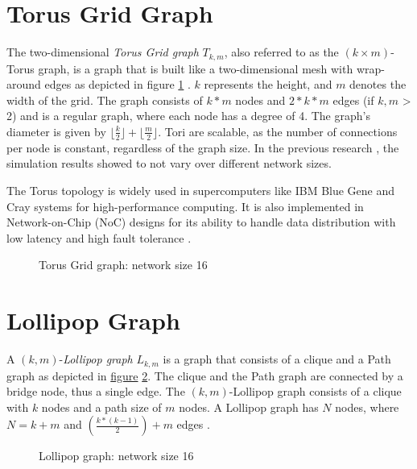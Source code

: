 \section{Torus Grid Graph}\label{sec:2torusgridgraph}
The two-dimensional \textit{Torus Grid graph} $T_{k,m}$, also referred to as the $(k \times m)$-Torus graph, is a graph that is built like a two-dimensional mesh with wrap-around edges as depicted in figure \ref{fig:torusGraph} \cite{Mahlmann2010}. $k$ represents the height, and $m$ denotes the width of the grid. The graph consists of $k * m$ nodes and $2* k * m$ edges (if $k, m$ > 2) and is a regular graph, where each node has a degree of 4. The graph's diameter is given by $\lfloor\frac{k}{2}\rfloor + \lfloor\frac{m}{2}\rfloor$. Tori are scalable, as the number of connections per node is constant, regardless of the graph size. In the previous research \cite{Bayazitoglu}, the simulation results showed to not vary over different network sizes.

The Torus topology is widely used in supercomputers like IBM Blue Gene and Cray systems for high-performance computing. It is also implemented in Network-on-Chip (NoC) designs for its ability to handle data distribution with low latency and high fault tolerance \cite{Banerjee2001}.

\begin{figure}[H]
    \centering
    \scalebox{1.5}{}
    \caption{Torus Grid graph: network size 16}
    \label{fig:torusGraph}
\end{figure}

\section{Lollipop Graph}\label{sec:2lollipopgraph}
A $(k, m)$-\textit{Lollipop graph} $L_{k,m}$ is a graph that consists of a clique and a Path graph as depicted in \hyperref[fig:lollipopgraphDemo]{figure} \ref{fig:lollipopgraphDemo}. The clique and the Path graph are connected by a bridge node, thus a single edge. The $(k, m)$-Lollipop graph consists of a clique with $k$ nodes and a path size of $m$ nodes. A Lollipop graph has $N$ nodes, where $N = k+m$ and $(\frac{k*(k-1)}{2})+m$ edges \cite{JonassonLollipopGraphs2000}.

\begin{figure}[H]
    \centering
    \scalebox{1}{}
    \caption{Lollipop graph: network size 16}
    \label{fig:lollipopgraphDemo}
\end{figure}

